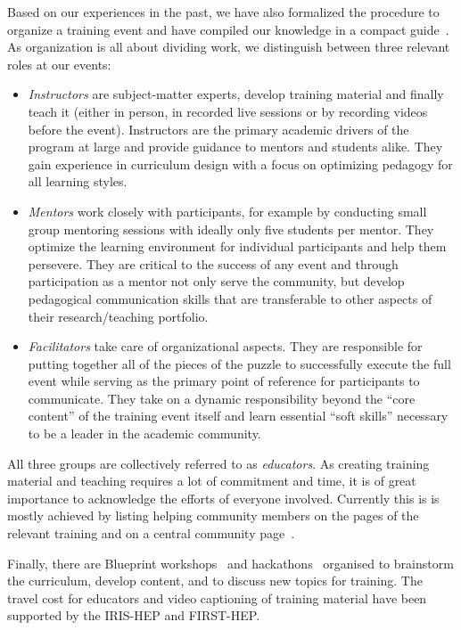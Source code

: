 \documentclass[twocolumn]{svjour3}          %
\begin{document}
Based on our experiences in the past, we have also formalized the procedure to organize  a training event and have compiled our knowledge in a compact guide~\cite{HSF-training-how-to}.
As organization is all about dividing work, we distinguish between three relevant roles at our events: 
\begin{itemize}
    \item \emph{Instructors} are subject-matter experts, develop training material and finally teach it (either in person, in recorded live sessions or by recording videos before the event).  Instructors are the primary academic drivers of the program at large and provide guidance to mentors and students alike. They gain experience in curriculum design with a focus on optimizing pedagogy for all learning styles.
    \item \emph{Mentors} work closely with participants, for example by conducting small group mentoring sessions with ideally only five students per mentor. They optimize the learning environment for individual participants and help them persevere.  They are critical to the success of any event and through participation as a mentor not only serve the community, but develop pedagogical communication skills that are transferable to other aspects of their research/teaching portfolio.
    \item \emph{Facilitators} take care of organizational aspects. They are responsible for putting together all of the pieces of the puzzle to successfully execute the full event while serving as the primary point of reference for participants to communicate. They take on a dynamic responsibility beyond the \enquote{core content} of the training event itself and learn essential \enquote{soft skills} necessary to be a leader in the academic community.
\end{itemize}
All three groups are collectively referred to as \emph{educators}.
As creating training material and teaching requires a lot of commitment and time, it is of great importance to acknowledge the efforts of everyone involved. Currently this is is mostly achieved by listing helping community members on the pages of the relevant training and on a central community page~\cite{HSF-training-community}.

Finally, there are Blueprint workshops~\cite{HSF-training-blueprint} and hackathons~\cite{HSF-training-hackathon} organised to brainstorm the curriculum, develop content, and to discuss new topics for training. The travel cost for educators and video captioning of training material have been supported by the IRIS-HEP and FIRST-HEP.
\end{document}
